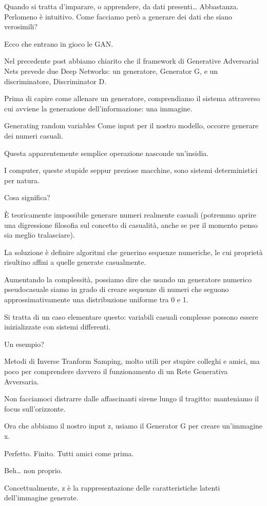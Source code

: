 Quando si tratta d’imparare, o apprendere, da dati presenti… Abbastanza. Perlomeno è intuitivo.
Come facciamo però a generare dei dati che siano verosimili?

Ecco che entrano in gioco le GAN.

Nel precedente post abbiamo chiarito che il framework di Generative Adversarial Nets prevede due Deep Networks: un generatore, Generator G, e un discriminatore, Discriminator D.

Prima di capire come allenare un generatore, comprendiamo il sistema attraverso cui avviene la generazione dell’informazione: una immagine.

Generating random variables
Come input per il nostro modello, occorre generare dei numeri casuali.

Questa apparentemente semplice operazione nasconde un’insidia.

I computer, queste stupide seppur preziose macchine, sono sistemi deterministici per natura.

Cosa significa?

È teoricamente impossibile generare numeri realmente casuali (potremmo aprire una digressione filosofia sul concetto di casualità, anche se per il momento penso sia meglio tralasciare).

La soluzione è definire algoritmi che generino sequenze numeriche, le cui proprietà risultino affini a quelle generate casualmente.

Aumentando la complessità, possiamo dire che usando un generatore numerico pseudocasuale siamo in grado di creare sequenze di numeri che seguono approssimativamente una distribuzione uniforme tra 0 e 1.

Si tratta di un caso elementare questo: variabili casuali complesse possono essere inizializzate con sistemi differenti.

Un esempio?

Metodi di Inverse Tranform Samping, molto utili per stupire colleghi e amici, ma poco per comprendere davvero il funzionamento di un Rete Generativa Avversaria.

Non facciamoci distrarre dalle affascinanti sirene lungo il tragitto: manteniamo il focus sull’orizzonte.

Ora che abbiamo il nostro input z, usiamo il Generator G per creare un’immagine x.

Perfetto. Finito. Tutti amici come prima.

Beh… non proprio.

Concettualmente, z è la rappresentazione delle caratteristiche latenti dell’immagine generate.

